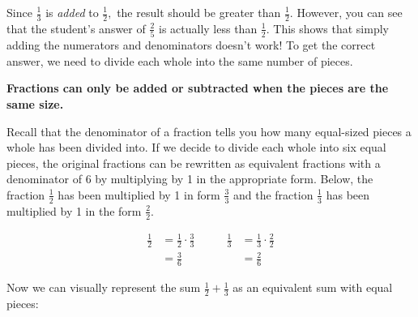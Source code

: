 \documentclass{ximera}
\begin{document}
Since $\textstyle \frac{1}{3}$ is \emph{added} to $\textstyle \frac{1}{2},$ the result should be greater than $\textstyle \frac{1}{2}.$  
However, you can see that the student's answer of $\textstyle \frac{2}{5}$ is actually less than $\textstyle \frac{1}{2}.$  
This shows that simply adding the numerators and denominators doesn't work!  To get the correct answer, we need to divide each whole into the 
same number of pieces. 


\begin{center}
\textbf{Fractions can only be added or subtracted when the pieces are the same size.}
\end{center}

Recall that the denominator of a fraction tells you how many equal-sized pieces a whole has been divided into.  If we decide to 
divide each whole into six equal pieces, the original fractions can be rewritten as equivalent fractions with a denominator of 6 by
multiplying by 1 in the appropriate form.  Below, the fraction $\frac{1}{2}$ has been multiplied by 1 in form $\frac{3}{3}$ and the 
fraction $\frac{1}{3}$ has been multiplied by 1 in the form $\frac{2}{2}.$ 

\begin{align*}
  \frac{1}{2} &= \frac{1}{2} \cdot \frac{3}{3} & \qquad \frac{1}{3} &= \frac{1}{3} \cdot \frac{2}{2} \\[10pt]
              &= \frac{3}{6}                   &  \qquad            &= \frac{2}{6}
              \end{align*}

Now we can visually represent the sum $\textstyle \frac{1}{2} + \frac{1}{3}$ as an equivalent sum with equal pieces:
\end{document}
